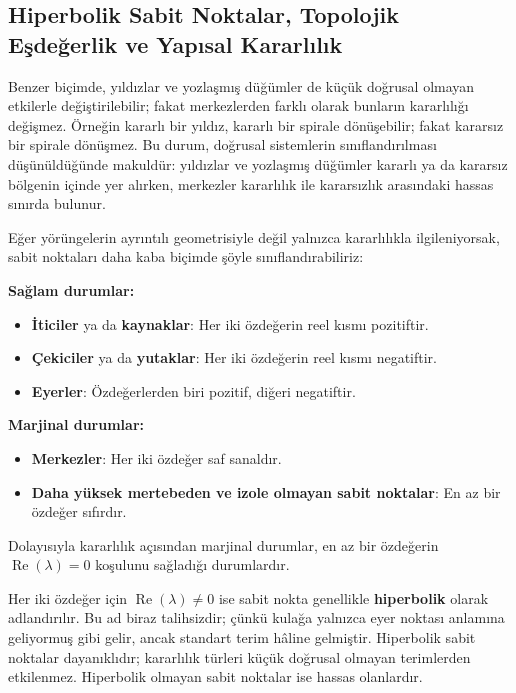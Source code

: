 \subsection*{Hiperbolik Sabit Noktalar, Topolojik Eşdeğerlik ve Yapısal Kararlılık}
{}

\begin{justify}
Benzer biçimde, yıldızlar ve yozlaşmış düğümler de küçük doğrusal olmayan etkilerle değiştirilebilir; fakat merkezlerden farklı olarak bunların kararlılığı değişmez. Örneğin kararlı bir yıldız, kararlı bir spirale dönüşebilir; fakat kararsız bir spirale dönüşmez. Bu durum, doğrusal sistemlerin sınıflandırılması düşünüldüğünde makuldür: yıldızlar ve yozlaşmış düğümler kararlı ya da kararsız bölgenin içinde yer alırken, merkezler kararlılık ile kararsızlık arasındaki hassas sınırda bulunur.

Eğer yörüngelerin ayrıntılı geometrisiyle değil yalnızca kararlılıkla ilgileniyorsak, sabit noktaları daha kaba biçimde şöyle sınıflandırabiliriz:

\textbf{Sağlam durumlar:}
\begin{itemize}
\item \textbf{İticiler} ya da \textbf{kaynaklar}: Her iki özdeğerin reel kısmı pozitiftir.
\item \textbf{Çekiciler} ya da \textbf{yutaklar}: Her iki özdeğerin reel kısmı negatiftir.
\item \textbf{Eyerler}: Özdeğerlerden biri pozitif, diğeri negatiftir.
\end{itemize}

\textbf{Marjinal durumlar:}
\begin{itemize}
\item \textbf{Merkezler}: Her iki özdeğer saf sanaldır.
\item \textbf{Daha yüksek mertebeden ve izole olmayan sabit noktalar}: En az bir özdeğer sıfırdır.
\end{itemize}

Dolayısıyla kararlılık açısından marjinal durumlar, en az bir özdeğerin $\operatorname{Re}(\lambda)=0$ koşulunu sağladığı durumlardır.

Her iki özdeğer için $\operatorname{Re}(\lambda)\neq0$ ise sabit nokta genellikle \textbf{hiperbolik} olarak adlandırılır. Bu ad biraz talihsizdir; çünkü kulağa yalnızca eyer noktası anlamına geliyormuş gibi gelir, ancak standart terim hâline gelmiştir. Hiperbolik sabit noktalar dayanıklıdır; kararlılık türleri küçük doğrusal olmayan terimlerden etkilenmez. Hiperbolik olmayan sabit noktalar ise hassas olanlardır.


\end{justify}
